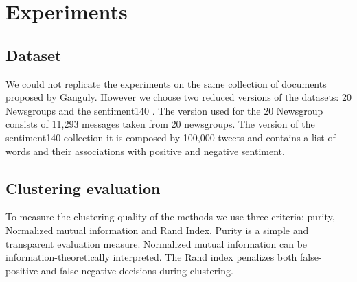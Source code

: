 \documentclass[runningheads]{llncs}
\begin{document}
\section{Experiments}

\subsection{Dataset}

We could not replicate the experiments on the same collection of
documents proposed by Ganguly\cite{ganguly_2018}. However 
we choose two reduced versions of the datasets:  20 Newsgroups\cite{2007:phd-Ana-Cardoso-Cachopo} and the sentiment140 \cite{sentiment140}.
The version used for the 20 Newsgroup consists of 11,293 messages taken from 20 newsgroups. 
The version of the sentiment140 collection it is composed by 100,000 tweets and contains a list of words and their associations with positive and negative sentiment.


%

\subsection{Clustering evaluation}

To measure the clustering quality of the methods we
use three criteria: purity, Normalized mutual information and Rand Index. Purity is
a simple and transparent evaluation measure. Normalized mutual information
can be information-theoretically interpreted. The Rand index penalizes both
false-positive and false-negative decisions during clustering.
\end{document}
